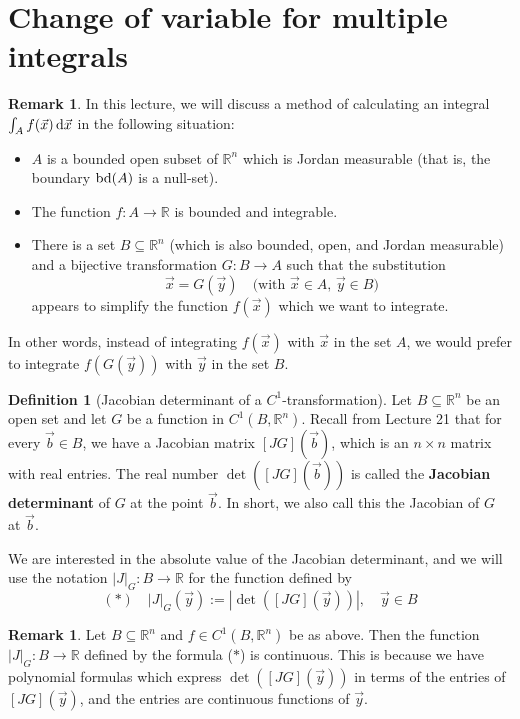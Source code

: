 \documentclass[11pt]{article}
\theoremstyle{definition}
\newtheorem{defn}[thm]{Definition}
\newtheorem{remark}[thm]{Remark}
\newcommand{\R}{\ensuremath{\mathbb{R}}}
\begin{document}
\newpage
\section{Change of variable for multiple integrals}

\begin{remark}
In this lecture, we will discuss a method of calculating an integral $\int_A f(\vec{x})\,{\rm d}\vec{x}$ in the following situation:
\vspace{-1.5ex}\begin{itemize}
    \item $A$ is a bounded open subset of $\R^n$ which is Jordan measurable (that is, the boundary ${\rm bd}(A)$ is a null-set).
    \item The function $f : A \to \R$ is bounded and integrable.
    \item There is a set $B \subseteq \R^n$ (which is also bounded, open, and Jordan measurable) and a bijective transformation $G : B \to A$ such that the substitution
    $$\vec{x} = G(\vec{y}) \quad \text{(with $\vec{x} \in A$, $\vec{y} \in B$)}$$
    appears to simplify the function $f(\vec{x})$ which we want to integrate.
\end{itemize}\vspace{-1.5ex}
In other words, instead of integrating $f(\vec{x})$ with $\vec{x}$ in the set $A$, we would prefer to integrate $f(G(\vec{y}))$ with $\vec{y}$ in the set $B$.
\end{remark}

\begin{defn}[Jacobian determinant of a $C^1$-transformation]
Let $B \subseteq \R^n$ be an open set and let $G$ be a function in $C^1(B, \R^n)$. Recall from Lecture 21 that for every $\vec{b} \in B$, we have a Jacobian matrix $[JG](\vec{b})$, which is an $n \times n$ matrix with real entries. The real number $\det([JG](\vec{b}))$ is called the {\bf Jacobian determinant} of $G$ at the point $\vec{b}$. In short, we also call this the Jacobian of $G$ at $\vec{b}$.

We are interested in the absolute value of the Jacobian determinant, and we will use the notation $|J|_G : B \to \R$ for the function defined by
$$(*) \quad |J|_G(\vec{y}) := |\det([JG](\vec{y}))|, \quad \vec{y} \in B$$
\end{defn}

\begin{remark}
Let $B \subseteq \R^n$ and $f \in C^1(B, \R^n)$ be as above. Then the function $|J|_G : B \to \R$ defined by the formula ($*$) is continuous. This is because we have polynomial formulas which express $\det([JG](\vec{y}))$ in terms of the entries of $[JG](\vec{y})$, and the entries are continuous functions of $\vec{y}$.
\end{remark}
\end{document}
